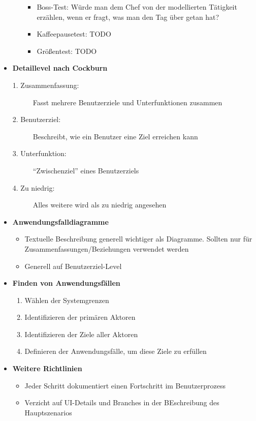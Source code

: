\begin{itemize}
\begin{itemize}
		\begin{itemize}
			\item Boss-Test: Würde man dem Chef von der modellierten Tätigkeit erzählen, wenn er fragt, was man den Tag über getan hat?
			\item Kaffeepausetest: TODO
			\item Größentest: TODO
		\end{itemize}
	\end{itemize}
	\item \textbf{Detaillevel nach Cockburn}
	\begin{description}
		\item[1. Zusammenfassung:] Fasst mehrere Benutzerziele und Unterfunktionen zusammen
		\item[2. Benutzerziel:] Beschreibt, wie ein Benutzer eine Ziel erreichen kann
		\item[3. Unterfunktion:] "`Zwischenziel"' eines Benutzerziels
		\item[4. Zu niedrig:] Alles weitere wird als zu niedrig angesehen
	\end{description}
	\item \textbf{Anwendungsfalldiagramme}
	\begin{itemize}
		\item Textuelle Beschreibung generell wichtiger als Diagramme. Sollten nur für Zusammenfassungen/Beziehungen verwendet werden
		\item Generell auf Benutzerziel-Level 
	\end{itemize}
	\item \textbf{Finden von Anwendungsfällen}
	\begin{enumerate}
		\item Wählen der Systemgrenzen
		\item Identifizieren der primären Aktoren
		\item Identifizieren der Ziele aller Aktoren
		\item Definieren der Anwendungsfälle, um diese Ziele zu erfüllen
	\end{enumerate}
	\item \textbf{Weitere Richtlinien}
	\begin{itemize}
		\item Jeder Schritt dokumentiert einen Fortschritt im Benutzerprozess
		\item Verzicht auf UI-Details und Branches in der BEschreibung des Hauptszenarios
	\end{itemize}
\end{itemize}


